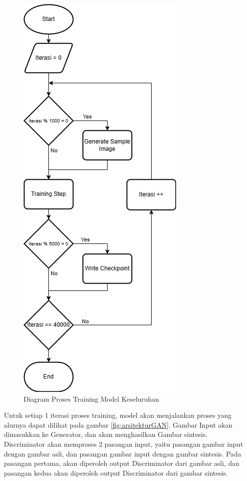 \documentclass[conference]{IEEEtran}
\begin{document}
\begin{figure}[ht]
  \centering
  \includegraphics[scale=0.5]{gambar/Training_model.png}
  \caption{Diagram Proses Training Model Keseluruhan}
  \label{fig:training}
\end{figure}

Untuk setiap 1 iterasi proses training, model akan menjalankan proses yang alurnya dapat dilihat pada gambar \ref{fig:arsitekturGAN}. 
Gambar Input akan dimasukkan ke Generator, dan akan menghasilkan Gambar sintesis. 
Discriminator akan memproses 2 pasangan input, yaitu pasangan gambar input dengan gambar asli, dan pasangan gambar input dengan gambar sintesis. 
Pada pasangan pertama, akan diperoleh output Discriminator dari gambar asli, dan pasangan kedua akan diperoleh output Discriminator dari gambar sintesis. 
\end{document}
